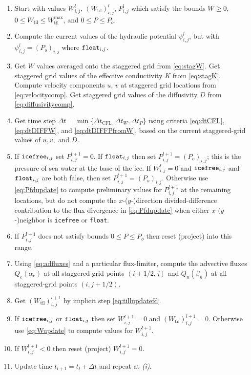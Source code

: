 \documentclass[11pt,final]{amsart}
\newcommand{\Wtil}{W_{\text{til}}}
\newcommand{\Wtilmax}{W_{\text{til}}^{\text{max}}}
\newcommand{\Wlij}{W^l_{i,j}}
\newcommand{\Plij}{P^l_{i,j}}
\begin{document}
\bigskip\medskip
\renewcommand{\labelenumi}{\emph{(\roman{enumi})}}
\begin{enumerate}
\item Start with values $\Wlij$, $(\Wtil)_{i,j}^l$, $\Plij$ which satisfy the bounds $W\ge 0$, $0\le \Wtil \le \Wtilmax$, and $0 \le P \le P_o$.
\item Compute the current values of the hydraulic potential $\psi_{i,j}^l$, but with $\psi_{i,j}^l=(P_o)_{i,j}$ where $\text{\texttt{float}}_{i,j}$.
\item Get $W$ values averaged onto the staggered grid from \eqref{eq:stagW}.  Get staggered grid values of the effective conductivity $K$ from \eqref{eq:stagK}.  Compute velocity components $u$, $v$ at staggered grid locations from \eqref{eq:velocitycomp}.  Get staggered grid values of the diffusivity $D$ from \eqref{eq:diffusivitycomp}.
\item Get time step $\Delta t = \min\{\Delta t_{\text{CFL}}, \Delta t_W, \Delta t_P\}$ using criteria \eqref{eq:dtCFL}, \eqref{eq:dtDIFFW}, and \eqref{eq:dtDIFFPfromW}, based on the current staggered-grid values of $u,v,$ and $D$.
\item If $\text{\texttt{icefree}}_{i,j}$ set $P_{i,j}^{l+1}=0$.  If $\text{\texttt{float}}_{i,j}$ then set $P_{i,j}^{l+1} = (P_o)_{i,j}$; this is the pressure of sea water at the base of the ice.  If $\Wlij=0$ and $\text{\texttt{icefree}}_{i,j}$ and $\text{\texttt{float}}_{i,j}$ are both false, then set $P_{i,j}^{l+1} = (P_o)_{i,j}$.  Otherwise use \eqref{eq:Pfdupdate} to compute preliminary values for $P_{i,j}^{l+1}$ at the remaining locations, but do not compute the $x$-($y$-)direction divided-difference contribution to the flux divergence in \eqref{eq:Pfdupdate} when either $x$-($y$-)neighbor is \texttt{icefree} or \texttt{float}.
\item If $P_{i,j}^{l+1}$ does not satisfy bounds $0 \le P \le P_o$ then reset (project) into this range.
\item Using \eqref{eq:adfluxes} and a particular flux-limiter, compute the advective fluxes $Q_e(\alpha_e)$ at all staggered-grid points $(i+1/2,j)$ and $Q_n(\beta_n)$ at all staggered-grid points $(i,j+1/2)$.  
\item Get $(\Wtil)_{i,j}^{l+1}$ by implicit step \eqref{eq:tillupdatefd}.
\item If $\text{\texttt{icefree}}_{i,j}$ or $\text{\texttt{float}}_{i,j}$ then set $W_{i,j}^{l+1}=0$ and $(\Wtil)_{i,j}^{l+1}=0$.  Otherwise use \eqref{eq:Wupdate} to compute values for $W_{i,j}^{l+1}$.
\item If $W_{i,j}^{l+1}<0$ then reset (project) $W_{i,j}^{l+1}=0$.
\item Update time $t_{l+1}=t_l+\Delta t$ and repeat at \emph{(i)}.
\end{enumerate}
\end{document}
